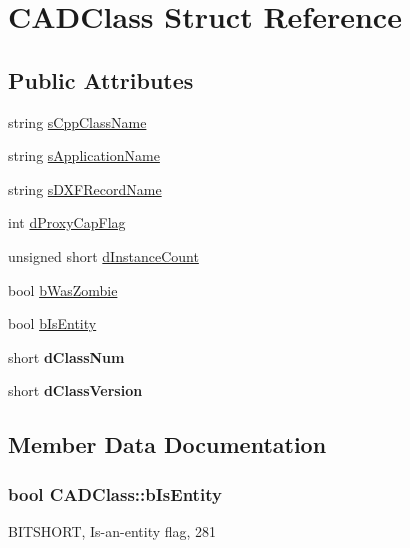 \hypertarget{struct_c_a_d_class}{}\section{C\+A\+D\+Class Struct Reference}
\label{struct_c_a_d_class}
\subsection*{Public Attributes}
\begin{DoxyCompactItemize}
\item 
string \hyperlink{struct_c_a_d_class_acfca1558a652e86d0b3b73638e85da9a}{s\+Cpp\+Class\+Name}
\item 
string \hyperlink{struct_c_a_d_class_a0526e446517876d44964dc2aa1e098bc}{s\+Application\+Name}
\item 
string \hyperlink{struct_c_a_d_class_a17535310e9f4855ac640f04f037a3e63}{s\+D\+X\+F\+Record\+Name}
\item 
int \hyperlink{struct_c_a_d_class_a47022deef6fa84a4062e39a66c822ee2}{d\+Proxy\+Cap\+Flag}
\item 
unsigned short \hyperlink{struct_c_a_d_class_abcf456bcb9c603da391bd7a10dde9344}{d\+Instance\+Count}
\item 
bool \hyperlink{struct_c_a_d_class_ab628f145a66c99a6a892cc1056e55088}{b\+Was\+Zombie}
\item 
bool \hyperlink{struct_c_a_d_class_a9b1ed095dff1ff1ee00d459f1431cb32}{b\+Is\+Entity}
\item 
short {\bfseries d\+Class\+Num}\hypertarget{struct_c_a_d_class_a40f8b560c964ad5323542c8dd3441e70}{}\label{struct_c_a_d_class_a40f8b560c964ad5323542c8dd3441e70}

\item 
short {\bfseries d\+Class\+Version}\hypertarget{struct_c_a_d_class_a4b128b4da96eced4cb33dd0a76b77034}{}\label{struct_c_a_d_class_a4b128b4da96eced4cb33dd0a76b77034}

\end{DoxyCompactItemize}


\subsection{Member Data Documentation}
\subsubsection[{\texorpdfstring{b\+Is\+Entity}{bIsEntity}}]{\setlength{\rightskip}{0pt plus 5cm}bool C\+A\+D\+Class\+::b\+Is\+Entity}\hypertarget{struct_c_a_d_class_a9b1ed095dff1ff1ee00d459f1431cb32}{}\label{struct_c_a_d_class_a9b1ed095dff1ff1ee00d459f1431cb32}
B\+I\+T\+S\+H\+O\+RT, Is-\/an-\/entity flag, 281 
